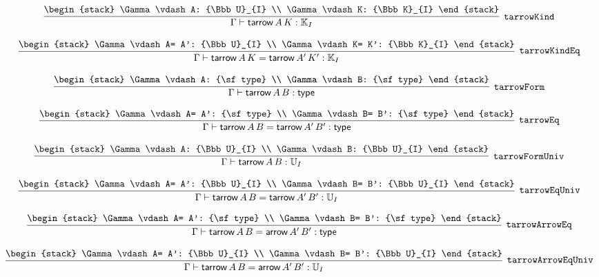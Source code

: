 \[
\infer[{\tt tarrowKind}]{\Gamma \vdash {\sf tarrow}\,A\,K: {\Bbb K}_{I}}{
\begin{stack}
\Gamma \vdash A: {\Bbb U}_{I}
\\
\Gamma \vdash K: {\Bbb K}_{I}
\end{stack}}
\]

\[
\infer[{\tt tarrowKindEq}]{\Gamma \vdash {\sf tarrow}\,A\,K= {\sf tarrow}\,A'\,K': {\Bbb K}_{I}}{
\begin{stack}
\Gamma \vdash A= A': {\Bbb U}_{I}
\\
\Gamma \vdash K= K': {\Bbb K}_{I}
\end{stack}}
\]

\[
\infer[{\tt tarrowForm}]{\Gamma \vdash {\sf tarrow}\,A\,B: {\sf type}}{
\begin{stack}
\Gamma \vdash A: {\sf type}
\\
\Gamma \vdash B: {\sf type}
\end{stack}}
\]

\[
\infer[{\tt tarrowEq}]{\Gamma \vdash {\sf tarrow}\,A\,B= {\sf tarrow}\,A'\,B': {\sf type}}{
\begin{stack}
\Gamma \vdash A= A': {\sf type}
\\
\Gamma \vdash B= B': {\sf type}
\end{stack}}
\]

\[
\infer[{\tt tarrowFormUniv}]{\Gamma \vdash {\sf tarrow}\,A\,B: {\Bbb U}_{I}}{
\begin{stack}
\Gamma \vdash A: {\Bbb U}_{I}
\\
\Gamma \vdash B: {\Bbb U}_{I}
\end{stack}}
\]

\[
\infer[{\tt tarrowEqUniv}]{\Gamma \vdash {\sf tarrow}\,A\,B= {\sf tarrow}\,A'\,B': {\Bbb U}_{I}}{
\begin{stack}
\Gamma \vdash A= A': {\Bbb U}_{I}
\\
\Gamma \vdash B= B': {\Bbb U}_{I}
\end{stack}}
\]

\[
\infer[{\tt tarrowArrowEq}]{\Gamma \vdash {\sf tarrow}\,A\,B= {\sf arrow}\,A'\,B': {\sf type}}{
\begin{stack}
\Gamma \vdash A= A': {\sf type}
\\
\Gamma \vdash B= B': {\sf type}
\end{stack}}
\]

\[
\infer[{\tt tarrowArrowEqUniv}]{\Gamma \vdash {\sf tarrow}\,A\,B= {\sf arrow}\,A'\,B': {\Bbb U}_{I}}{
\begin{stack}
\Gamma \vdash A= A': {\Bbb U}_{I}
\\
\Gamma \vdash B= B': {\Bbb U}_{I}
\end{stack}}
\]

